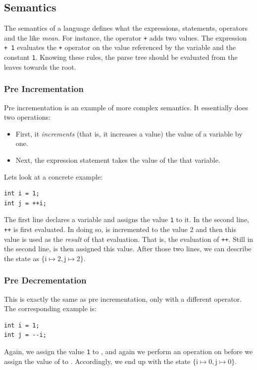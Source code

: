 \subsection{Semantics}

The semantics of a language defines what the expressions, statements, operators and the like \textsl{mean}. For instance, the operator \texttt{+} adds two values. The expression \texttt{ + 1} evaluates the \texttt{+} operator on the value referenced by the variable  and the constant \texttt{1}. Knowing these rules, the parse tree should be evaluated from the leaves towards the root.

\subsubsection{Pre Incrementation}

Pre incrementation is an example of more complex semantics. It essentially does two operations:
\begin{itemize}
  \item First, it \textsl{increments} (that is, it increases a value) the value of a variable by one.
  \item Next, the expression statement takes the value of the that variable.
\end{itemize}
Lets look at a concrete example:
\begin{verbatim}
int i = 1;
int j = ++i;
\end{verbatim}
The first line declares a variable  and assigns the value \texttt{1} to it. In the second line, \texttt{++} is first evaluated. In doing so,  is incremented to the value 2 and then this value is used as the \textsl{result} of that evaluation. That is, the evaluation of \texttt{++}. Still in the second line,  is then assigned this value. After those two lines, we can describe the state as $\{\mathrm{i} \mapsto 2, \mathrm{j} \mapsto 2\}$.

\subsubsection{Pre Decrementation}

This is exactly the same as pre incrementation, only with a different operator. The corresponding example is:
\begin{verbatim}
int i = 1;
int j = --i;
\end{verbatim}
Again, we assign the value \texttt{1} to , and again we perform an operation on  before we assign the value of  to . Accordingly, we end up with the state $\{\mathrm{i} \mapsto 0, \mathrm{j} \mapsto 0\}$.

